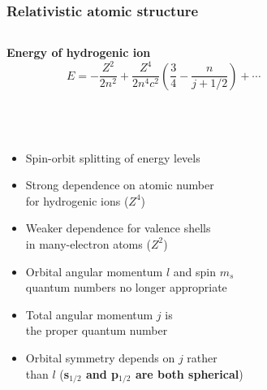 \documentclass[mathserif,8pt]{beamer}
\begin{document}
\begin{frame}
    \frametitle{Relativistic atomic structure}
    \begin{columns}
    \begin{column}{.50\textwidth}
	\centering
    	\textbf{Energy of hydrogenic ion}
	\begin{equation}
	    \nonumber
	    E = -\frac{Z^2}{2n^2} + \frac{Z^4}{2n^4c^2}\left(\frac{3}{4}-\frac{n}{j+1/2}\right) + \cdots
	\end{equation}
	\ \\
	\ \\
	\ \\
	\begin{itemize}
	    \item   Spin-orbit splitting of energy levels 
	    \item   Strong dependence on atomic number\\ 
		    for hydrogenic ions ($Z^4$)
	    \item   Weaker dependence for valence shells\\
		    in many-electron atoms ($Z^2$)
	    \item   Orbital angular momentum $l$ and spin $m_s$\\
		    quantum numbers no longer appropriate
	    \item   Total angular momentum $j$ is\\
		    the proper quantum number
	    \item   Orbital symmetry depends on $j$ rather\\ 
		    than $l$ (\textbf{s$_{1/2}$ and p$_{1/2}$ are both spherical})
	\end{itemize}
    \end{column}
    \begin{column}{.50\textwidth}
	\centering

\end{column}
\end{columns}
\end{frame}
\end{document}
